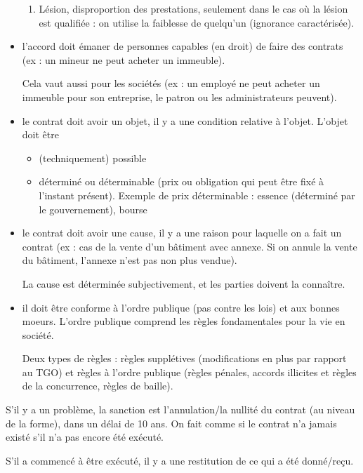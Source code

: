 \begin{itemize}
\begin{enumerate}
				\item Lésion, disproportion des prestations, seulement dans le cas où la lésion est qualifiée : on utilise la faiblesse de quelqu'un (ignorance caractérisée).
			\end{enumerate} 
			
			\item l'accord doit émaner de personnes capables (en droit) de faire des contrats (ex : un mineur ne peut acheter un immeuble). 
			
			Cela vaut aussi pour les sociétés (ex : un employé ne peut acheter un immeuble pour son entreprise, le patron ou les administrateurs peuvent).
			
			\item le contrat doit avoir un objet, il y a une condition relative à l'objet. L'objet doit être
			
			\begin{itemize}
				\item (techniquement) possible
				\item déterminé ou déterminable (prix ou obligation qui peut être fixé à l'instant présent). Exemple de prix déterminable : essence (déterminé par le gouvernement), bourse
			\end{itemize}
			
			\item le contrat doit avoir une cause, il y a une raison pour laquelle on a fait un contrat (ex : cas de la vente d'un bâtiment avec annexe. Si on annule la vente du bâtiment, l'annexe n'est pas non plus vendue).
			
			La cause est déterminée subjectivement, et les parties doivent la connaître.
			
			\item il doit être conforme à l'ordre publique (pas contre les lois) et aux bonnes moeurs. L'ordre publique comprend les règles fondamentales pour la vie en société.
			
			Deux types de règles : règles supplétives (modifications en plus par rapport au TGO) et règles à l'ordre publique (règles pénales, accords illicites et règles de la concurrence, règles de baille).
		\end{itemize}
		
		S'il y a un problème, la sanction est l'annulation/la nullité du contrat (au niveau de la forme), dans un délai de 10 ans.
		On fait comme si le contrat n'a jamais existé s'il n'a pas encore été exécuté. 
		
		S'il a commencé à être exécuté, il y a une restitution de ce qui a été donné/reçu. 
		
